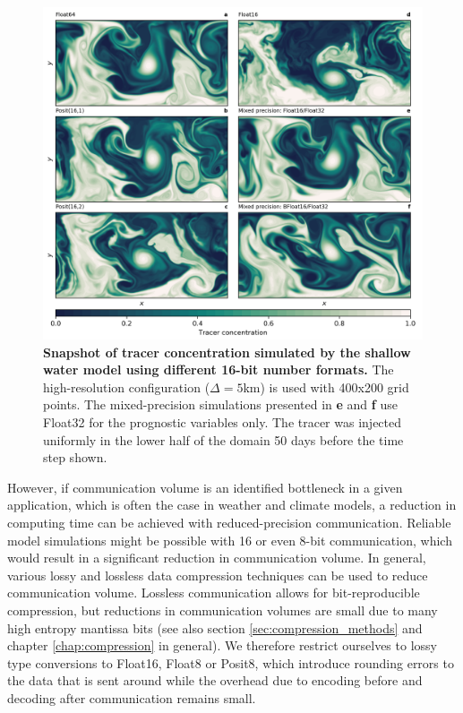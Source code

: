 \begin{figure}[htbp]
\includegraphics[width=1\textwidth]{Figures/swm/snapshot.png}
\caption{\textbf{Snapshot of tracer concentration simulated by the shallow water model using different 16-bit number formats.}
The high-resolution configuration ($\Delta = 5$km) is used with 400x200 grid points. The mixed-precision simulations presented
in \textbf{e} and \textbf{f} use Float32 for the prognostic variables only. The tracer was injected uniformly in the lower half of the
domain 50 days before the time step shown.}
\label{fig:snapshot}
\end{figure}

However, if communication volume is an identified bottleneck in a given application, which is often the case in weather and
climate models, a reduction in computing time can be achieved with reduced-precision communication. Reliable model simulations
might be possible with 16 or even 8-bit communication, which would result in a significant reduction in communication volume.
In general, various lossy and lossless data compression techniques can be used to reduce communication volume. Lossless
communication allows for bit-reproducible compression, but reductions in communication volumes are small due to many
high entropy mantissa bits (see also section \ref{sec:compression_methods} and chapter
\ref{chap:compression} in general). We therefore restrict ourselves to lossy type conversions to Float16, Float8 or Posit8,
which introduce rounding errors to the data that is sent around while the overhead due to encoding before and decoding
after communication remains small.

